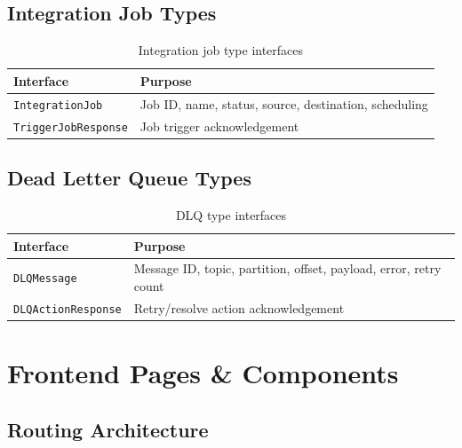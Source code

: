\documentclass[12pt,a4paper]{article}
\begin{document}
\subsection{Integration Job Types}

\begin{table}[H]
\centering
\begin{tabularx}{\textwidth}{lX}
\toprule
\textbf{Interface} & \textbf{Purpose} \\
\midrule
\texttt{IntegrationJob}     & Job ID, name, status, source, destination, scheduling \\
\texttt{TriggerJobResponse} & Job trigger acknowledgement \\
\bottomrule
\end{tabularx}
\caption{Integration job type interfaces}
\end{table}

\subsection{Dead Letter Queue Types}

\begin{table}[H]
\centering
\begin{tabularx}{\textwidth}{lX}
\toprule
\textbf{Interface} & \textbf{Purpose} \\
\midrule
\texttt{DLQMessage}        & Message ID, topic, partition, offset, payload, error, retry count \\
\texttt{DLQActionResponse} & Retry/resolve action acknowledgement \\
\bottomrule
\end{tabularx}
\caption{DLQ type interfaces}
\end{table}

\section{Frontend Pages \& Components}

\subsection{Routing Architecture}
\end{document}

